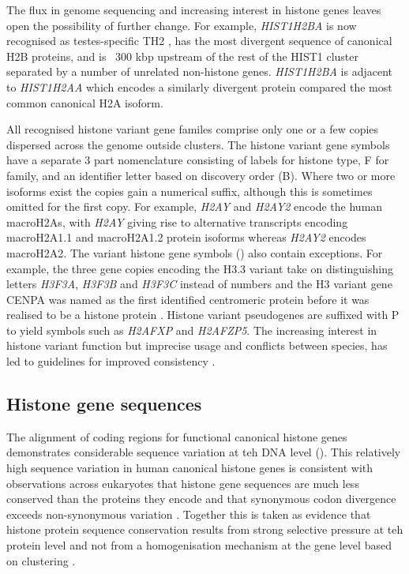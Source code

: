 	The flux in genome sequencing and increasing interest in histone genes 
	leaves open the possibility of further change. 
	For example, \textit{HIST1H2BA} is now recognised as testes-specific TH2 , 
	has the most divergent sequence of canonical H2B proteins, 
	and is ~300 kbp upstream of the rest of the HIST1 cluster 
	separated by a number of unrelated non-histone genes. 
	\textit{HIST1H2BA} is adjacent to \textit{HIST1H2AA} 
	which encodes a similarly divergent protein compared the most common canonical H2A isoform.
	
	All recognised histone variant gene familes comprise only one or a few copies 
	dispersed across the genome outside clusters.
	The histone variant gene symbols have a separate 3 part nomenclature 
	consisting of labels for histone type, F for family, 
	and an identifier letter based on discovery order (B).
	Where two or more isoforms exist the copies gain a numerical suffix, 
	although this is sometimes omitted for the first copy. 
	For example, \textit{H2AY} and \textit{H2AY2} encode the human macroH2As, 
	with \textit{H2AY} giving rise to alternative transcripts encoding macroH2A1.1 and macroH2A1.2 protein isoforms 
	whereas \textit{H2AY2} encodes macroH2A2.
	The variant histone gene symbols () also contain exceptions. 
	For example, the three gene copies encoding the H3.3 variant 
	take on distinguishing letters \textit{H3F3A}, \textit{H3F3B} and \textit{H3F3C} instead of numbers 
	and the H3 variant gene CENPA was named as the first identified centromeric protein \cite{CENPA-first-report} 
	before it was realised to be a histone protein \citep{CENPA-copurifies-histones, CENPA-sequence-analysis}. 
	Histone variant pseudogenes are suffixed with P to yield symbols such as \textit{H2AFXP} and \textit{H2AFZP5}.
	The increasing interest in histone variant function 
	but imprecise usage and conflicts between species, 
	has led to guidelines for improved consistency .

  \subsection{Histone gene sequences}

	The alignment of coding regions for functional canonical histone genes 
	demonstrates considerable sequence variation at teh DNA level (). 
	This relatively high sequence variation in human canonical histone genes 
	is consistent with observations across eukaryotes 
	that histone gene sequences are much less conserved than the proteins they encode 
	and that synonymous codon divergence exceeds non-synonymous variation  . 
	Together this is taken as evidence that histone protein sequence conservation 
	results from strong selective pressure at teh protein level 
	and not from a homogenisation mechanism at the gene level based on clustering .

